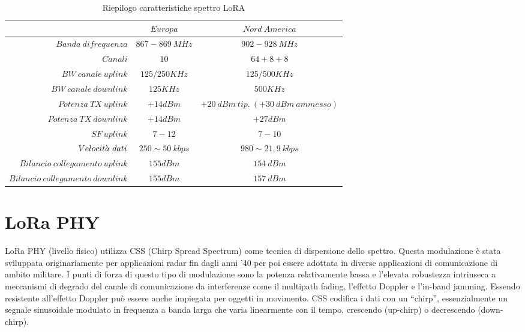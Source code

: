 \documentclass[12pt,a4paper,openright,twoside]{report}
\begin{document}
\begin{table}[h]                        
\begin{center}                          
\begin{tabular}{r|c|c}                  
$ $& $Europa$ & $Nord\ America$\\         
\hline\hline                                  
$Banda\ di frequenza$ & $867-869\ MHz$ & $902-928\ MHz$\\     
\hline                               
$Canali$ & $10$ & $64 + 8 +8$\\
\hline        
$BW\ canale\ uplink$ & $125/250 KHz$ & $125/500 KHz$\\ 
\hline 
$BW\ canale\ downlink$ & $125 KHz$ & $500 KHz$\\ 
\hline 
$Potenza\ TX\ uplink$ & $+14 dBm$ & $+20\ dBm\ tip.\ (+30\ dBm\ ammesso)$\\ 
\hline
$Potenza\ TX\ downlink$ & $+14 dBm$ & $+27 dBm $\\ 
\hline                                
$SF\ uplink$ & $7-12$ & $7-10$\\ 
\hline        
$Velocit\Grave{a}\ dati$ & $250 \sim 50\ kbps$ & $980 \sim 21,9\ kbps$\\ 
\hline 
$Bilancio\ collegamento\ uplink$ &$155 dBm$ & $ 154\ dBm$\\ 
\hline 
$Bilancio\ collegamento\ downlink$ &$155 dBm$ & $ 157\ dBm$\\ 
\hline \hline                         
\end{tabular}
\caption[Riepilogo caratteristiche spettro LoRA]{Riepilogo caratteristiche spettro LoRA}\label{tab:uno}
\end{center}
\end{table}



\section{LoRa PHY}
LoRa PHY (livello fisico) utilizza CSS (Chirp Spread Spectrum) come tecnica di dispersione dello spettro. 
Questa modulazione \`e stata sviluppata originariamente per applicazioni radar fin dagli anni '40 per poi essere adottata in diverse applicazioni di comunicazione di ambito militare. I punti di forza di questo tipo di modulazione sono la potenza relativamente bassa e l'elevata robustezza intrinseca a meccanismi di degrado del canale di comunicazione da interferenze come il multipath fading, l'effetto Doppler e l'in-band jamming. Essendo resistente all'effetto Doppler pu\`o essere anche impiegata per oggetti in movimento. 
CSS codifica i dati con un ``chirp'', essenzialmente un segnale sinusoidale modulato in frequenza a banda larga che varia linearmente con il tempo, crescendo (up-chirp) o decrescendo (down-chirp). 
\end{document}

